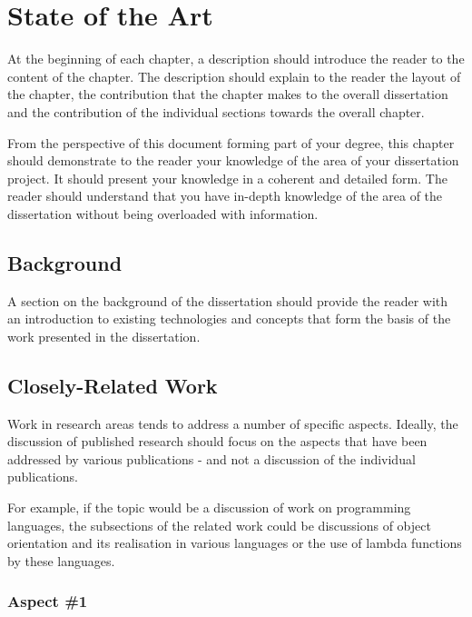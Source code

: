 \chapter{State of the Art}

At the beginning of each chapter, a description should introduce the reader to the content of the chapter. The description should explain to the reader the layout of the chapter, the contribution that the chapter makes to the overall dissertation and the contribution of the individual sections towards the overall chapter.

From the perspective of this document forming part of your degree, this chapter should demonstrate to the reader your knowledge of the area of your dissertation project. It should present your knowledge in a coherent and detailed form. The reader should understand that you have in-depth knowledge of the area of the dissertation without being overloaded with information.

\section{Background}


A section on the background of the dissertation should provide the reader with an introduction to existing technologies and concepts that form the basis of the
work presented in the dissertation.


\section{Closely-Related Work}

Work in research areas tends to address a number of specific aspects. Ideally, the discussion of published research should focus on the aspects that have been addressed by various publications - and not a discussion of the individual publications.

For example, if the topic would be a discussion of work on programming languages, the subsections of the related work could be discussions of object orientation and its realisation in various languages or the use of lambda functions by these languages.

\subsection{Aspect \#1}



